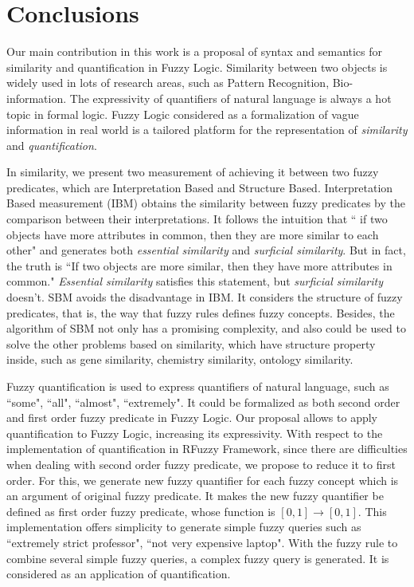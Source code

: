 \documentclass[Thesis.tex]{subfiles}
\begin{document}
\chapter{Conclusions}
\label{chap:Conclusions}

Our main contribution in this work is a proposal of syntax and semantics for similarity and quantification in Fuzzy Logic.
Similarity between two objects is widely used in lots of research areas, such as Pattern Recognition, Bio-information. The expressivity of quantifiers of natural language is always a hot topic in formal logic. Fuzzy Logic considered as a formalization of vague information in real world is a tailored platform for the representation of \textit{similarity} and \textit{quantification}. 

In similarity, we present two measurement of achieving it between two fuzzy predicates, which are Interpretation Based and Structure Based. Interpretation Based measurement (IBM) obtains the similarity between fuzzy predicates by the comparison between their interpretations. 
It follows the intuition that `` if two objects have more attributes in common, then they are more similar to each other" and generates both \textit{essential similarity} and \textit{surficial similarity}.
But in fact, the truth is ``If two objects are more similar, then they have more attributes in common." 
\textit{Essential similarity} satisfies this statement, but \textit{surficial similarity} doesn't. SBM avoids the disadvantage in IBM. It considers the structure of fuzzy predicates, that is, the way that fuzzy rules defines fuzzy concepts. Besides, the algorithm of SBM not only has a promising complexity, and also could be used to solve the other problems based on similarity, which have structure property inside, such as gene similarity, chemistry similarity, ontology similarity.

Fuzzy quantification is used to express quantifiers of natural language, such as ``some", ``all", ``almost", ``extremely". It could be formalized as both second order and first order fuzzy predicate in Fuzzy Logic. Our proposal allows to apply quantification to Fuzzy Logic, increasing its expressivity. 
With respect to the implementation of quantification in RFuzzy Framework,  since there are difficulties when dealing with second order fuzzy predicate, we propose to reduce it to first order.  For this, we generate new fuzzy quantifier for each fuzzy concept which is an argument of original fuzzy predicate. It makes the new fuzzy quantifier be defined as first order fuzzy predicate, whose function is $[0,1] \rightarrow [0,1]$. This implementation offers simplicity to generate simple fuzzy queries such as ``extremely strict professor", ``not very expensive laptop". With the fuzzy rule to combine several simple fuzzy queries, a complex fuzzy query is generated. It is considered as an application of quantification.
\end{document}
